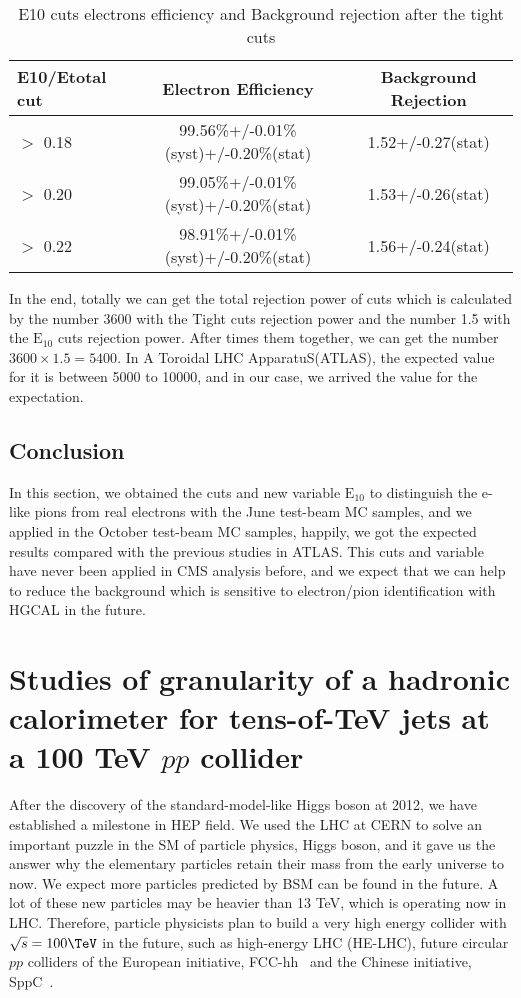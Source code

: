 \documentclass[12pt,twoside,a4paper,an,final]{cms-tdr}
\begin{document}
\begin{table}[h]%
    \centering
    \begin{tabular}{|l|c|c|}
    \hline
    E10/Etotal cut & Electron Efficiency & Background Rejection\\\hline
    $>$ 0.18 &  99.56\%+/-0.01\%(syst)+/-0.20\%(stat) &  1.52+/-0.27(stat)\\\hline  
    $>$ 0.20 &  99.05\%+/-0.01\%(syst)+/-0.20\%(stat) &  1.53+/-0.26(stat)\\\hline  
    $>$ 0.22 &  98.91\%+/-0.01\%(syst)+/-0.20\%(stat) &  1.56+/-0.24(stat)\\\hline  
        \end{tabular}
    \caption{E10 cuts electrons efficiency and Background rejection after the tight cuts}\label{basic_7}  %
\end{table}


In the end, totally we can get the total rejection power of cuts which is calculated by the number 3600 with the Tight cuts rejection power and the number 1.5 with the $\mathrm{E_{10}}$ cuts rejection power. After times them together, we can get the number $3600\times1.5=5400$. In A Toroidal LHC ApparatuS(ATLAS), the expected value for it is between 5000 to 10000, and in our case, we arrived the value for the expectation. 
\subsection{Conclusion}
In this section, we obtained the cuts and new variable $\mathrm{E_{10}}$ to distinguish the e-like pions from real electrons with the June test-beam MC samples, and we applied in the October test-beam MC samples, happily, we got the expected results compared with the previous studies in ATLAS. This cuts and variable have never been applied in CMS analysis before, and we expect that we can help to reduce the background which is sensitive to electron/pion identification with HGCAL in the future.

\section{Studies of granularity of a hadronic calorimeter for tens-of-TeV jets at a 100 TeV $pp$ collider}
After the discovery of the standard-model-like Higgs boson at 2012\cite{Chatrchyan:2012xdj}, we have established a milestone in HEP field. We used the LHC at CERN to solve an important puzzle in the SM of particle physics, Higgs boson, and it gave us the answer why the elementary particles retain their mass\cite{PhysRevLett.13.508} from the early universe to now. We expect more particles predicted by BSM can be found in the future. A lot of these new particles may be heavier than 13 TeV\cite{Contino:2016spe}\cite{Mangano:2016jyj}, which is operating now in LHC. Therefore, particle physicists plan to build a very high energy collider with $\sqrt{s} = 100\TeV$ in the future, such as high-energy LHC (HE-LHC), future circular $pp$ colliders of the European initiative, FCC-hh~\cite{Benedikt:2206376} and the Chinese initiative, SppC~\cite{Tang:2015qga}. \\
\end{document}
